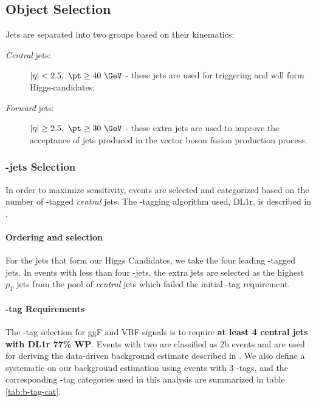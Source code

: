 \subsection{Object Selection}

Jets are separated into two groups based on their kinematics: 
\begin{description}
	\item[\textit{Central} jets:] $|\eta| < 2.5,\ \pt \ge 40\ \GeV$ -  these jets are used for triggering and will form  Higgs-candidates;
	\item[\textit{Forward} jets:] $|\eta| \ge 2.5,\ \pt \ge 30\ \GeV$ - these extra jets are used to improve the acceptance of jets produced in the vector boson fusion production process.
\end{description}

\subsubsection{\Pqb-jets Selection}
\label{sec:sel-btag}

In order to maximize sensitivity, events are selected and categorized based on the number of \Pqb-tagged \textit{central} jets. 
The \Pqb-tagging algorithm used, DL1r, is described in \Sect{\ref{subsec:ftag}}. 

\paragraph{Ordering and selection} For the jets that form our Higgs Candidates, we take the four leading \Pqb-tagged jets. In events with less than four \Pqb-jets, the extra jets are selected as the highest $p_T$ jets from the pool of \textit{central} jets which failed the initial \Pqb-tag requirement.

\paragraph{\Pqb-tag Requirements} The \Pqb-tag selection for ggF and VBF signals is to require \textbf{at least 4 central jets with DL1r 77\% WP}. Events with two \bjets are classified as 2b events and are used for deriving the data-driven background estimate described in \Sect{\ref{sec:bkgdestimation}}. We also define a systematic on our background estimation using events with 3 \Pqb-tags, and the corresponding \Pqb-tag categories used in this analysis are summarized in table \ref{tab:b-tag-cat}.

